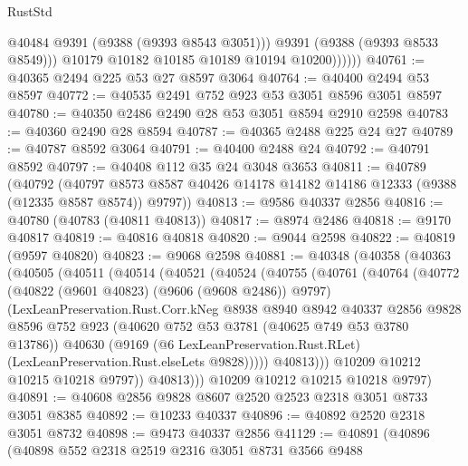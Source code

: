 \begin{lexlean}{RustStd}
\begin{coremodule}
                    @40484
                    @9391
                    (@9388 (@9393 @8543 @3051)))
                  @9391
                  (@9388 (@9393 @8533 @8549)))
                @10179
                @10182
                @10185
                @10189
                @10194
                @10200))))))
@40761 := @40365 @2494 @225 @53 @27 @8597 @3064
@40764 := @40400 @2494 @53 @8597
@40772 := @40535 @2491 @752 @923 @53 @3051 @8596 @3051 @8597
@40780 := @40350 @2486 @2490 @28 @53 @3051 @8594 @2910 @2598
@40783 := @40360 @2490 @28 @8594
@40787 := @40365 @2488 @225 @24 @27
@40789 := @40787 @8592 @3064
@40791 := @40400 @2488 @24
@40792 := @40791 @8592
@40797 := @40408 @112 @35 @24 @3048 @3653
@40811 := @40789
    (@40792
      (@40797 @8573 @8587 @40426 @14178 @14182 @14186 @12333 (@9388 (@12335 @8587 @8574)) @9797))
@40813 := @9586 @40337 @2856
@40816 := @40780 (@40783 (@40811 @40813))
@40817 := @8974 @2486
@40818 := @9170 @40817
@40819 := @40816 @40818
@40820 := @9044 @2598
@40822 := @40819 (@9597 @40820)
@40823 := @9068 @2598
@40881 := @40348
    (@40358
      (@40363
        (@40505
          (@40511
            (@40514
              (@40521
                (@40524
                  (@40755
                    (@40761
                      (@40764
                        (@40772
                          (@40822 (@9601 @40823) (@9606 (@9608 @2486)) @9797)
                          (LexLeanPreservation.Rust.Corr.kNeg
                            @8938
                            @8940
                            @8942
                            @40337
                            @2856
                            @9828
                            @8596
                            @752
                            @923
                            (@40620 @752 @53 @3781 (@40625 @749 @53 @3780 @13786))
                            @40630
                            (@9169
                              (@6 LexLeanPreservation.Rust.RLet)
                              (LexLeanPreservation.Rust.elseLets @9828)))))
                      @40813)))
                @10209
                @10212
                @10215
                @10218
                @9797))
            @40813)))
      @10209
      @10212
      @10215
      @10218
      @9797)
@40891 := @40608 @2856 @9828 @8607 @2520 @2523 @2318 @3051 @8733 @3051 @8385
@40892 := @10233 @40337
@40896 := @40892 @2520 @2318 @3051 @8732
@40898 := @9473 @40337 @2856
@41129 := @40891
    (@40896
      (@40898
        @552
        @2318
        @2519
        @2316
        @3051
        @8731
        @3566
        @9488

\end{coremodule}
\end{lexlean}

